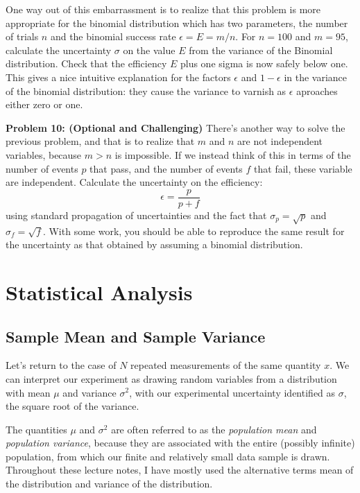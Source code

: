 \documentclass[12pt,oneside]{book}
\begin{document}
One way out of this embarrassment is to realize that this problem is
more appropriate for the binomial distribution which has two
parameters, the number of trials $n$ and the binomial success rate
$\epsilon = E = m/n$.  For $n=100$ and $m=95$, calculate the
uncertainty $\sigma$ on the value $E$ from the variance of the
Binomial distribution.  Check that the efficiency $E$ plus one sigma
is now safely below one.  This gives a nice intuitive explanation for
the factors $\epsilon$ and $1-\epsilon$ in the variance of the
binomial distribution: they cause the variance to varnish as $\epsilon$
aproaches either zero or one.\\ \vskip 0.25cm

\noindent
{\bf Problem 10: (Optional and Challenging)} There's another way to solve the
previous problem, and that is to realize that $m$ and $n$ are not
independent variables, because $m > n$ is impossible.  If we instead
think of this in terms of the number of events $p$ that pass, and the
number of events $f$ that fail, these variable are independent.
Calculate the uncertainty on the efficiency:
\begin{displaymath}
\epsilon = \frac{p}{p+f}
\end{displaymath}
using standard propagation of uncertainties and the fact that $\sigma_p = \sqrt{p}$ and $\sigma_f = \sqrt{f}$.  With some work, you should be able to reproduce the same result for the uncertainty as that obtained by assuming a binomial distribution. \\ \vskip 0.25cm

\chapter{Statistical Analysis}

\section{Sample Mean and Sample Variance}

Let's return to the case of $N$ repeated measurements of the same
quantity $x$.  We can interpret our experiment as drawing random
variables from a distribution with mean $\mu$ and variance $\sigma^2$,
with our experimental uncertainty identified as $\sigma$, the square
root of the variance.

The quantities $\mu$ and $\sigma^2$ are often referred to as the
{\em population mean} and {\em population variance}, because they are associated
with the entire (possibly infinite) population, from which our
finite and relatively small data sample is drawn.  Throughout these
lecture notes, I have mostly used the alternative terms mean of the
distribution and variance of the distribution.
\end{document}
